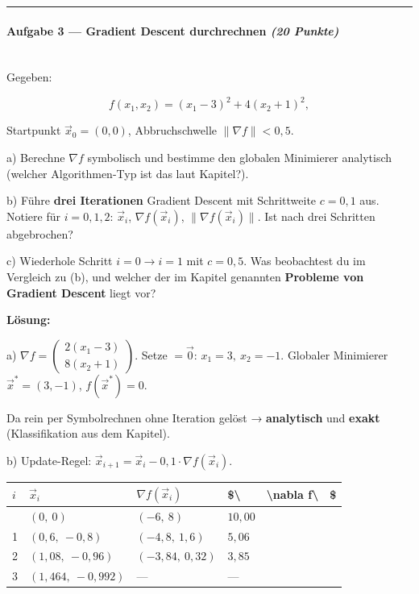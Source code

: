 \documentclass[11pt, a4paper]{article}
\begin{document}
\noindent\textcolor{rulegray}{\rule{\linewidth}{0.4pt}}


\paragraph{Aufgabe 3 — Gradient Descent durchrechnen \textit{(20 Punkte)}}\mbox{}\\[2pt]

Gegeben:

\[
f(x_1,x_2) = (x_1 - 3)^2 + 4(x_2 + 1)^2,
\]

Startpunkt $\vec x_0 = (0, 0)$, Abbruchschwelle $\|\nabla f\| < 0{,}5$.


a) Berechne $\nabla f$ symbolisch und bestimme den globalen Minimierer analytisch (welcher Algorithmen-Typ ist das laut Kapitel?).


b) Führe \textbf{drei Iterationen} Gradient Descent mit Schrittweite $c = 0{,}1$ aus. Notiere für $i=0,1,2$: $\vec x_i$, $\nabla f(\vec x_i)$, $\|\nabla f(\vec x_i)\|$. Ist nach drei Schritten abgebrochen?


c) Wiederhole Schritt $i=0 \to i=1$ mit $c = 0{,}5$. Was beobachtest du im Vergleich zu (b), und welcher der im Kapitel genannten \textbf{Probleme von Gradient Descent} liegt vor?


\textbf{Lösung:}


a) $\nabla f = \begin{pmatrix} 2(x_1-3) \\ 8(x_2+1) \end{pmatrix}$. Setze $=\vec 0$: $x_1 = 3,\ x_2 = -1$. Globaler Minimierer $\vec x^* = (3,-1)$, $f(\vec x^*) = 0$.

Da rein per Symbolrechnen ohne Iteration gelöst → \textbf{analytisch} und \textbf{exakt} (Klassifikation aus dem Kapitel).


b) Update-Regel: $\vec x_{i+1} = \vec x_i - 0{,}1 \cdot \nabla f(\vec x_i)$.



{\small
\begin{tabularx}{\linewidth}{XXXXXX}
\hline
\rowcolor{tableheadbg}
{\color{white}\textbf{$i$}} & {\color{white}\textbf{$\vec x_i$}} & {\color{white}\textbf{$\nabla f(\vec x_i)$}} & {\color{white}\textbf{\$\textbackslash{}}} & {\color{white}\textbf{\textbackslash{}nabla f\textbackslash{}}} & {\color{white}\textbf{\$}} \\[2pt]
\hline
\endhead
\hline
\endfoot
0 & $(0,\ 0)$ & $(-6,\ 8)$ & $10{,}00$ &  &  \\
1 & $(0{,}6,\ -0{,}8)$ & $(-4{,}8,\ 1{,}6)$ & $5{,}06$ &  &  \\
2 & $(1{,}08,\ -0{,}96)$ & $(-3{,}84,\ 0{,}32)$ & $3{,}85$ &  &  \\
3 & $(1{,}464,\ -0{,}992)$ & — & — &  &  \\
\end{tabularx}
}
\end{document}
